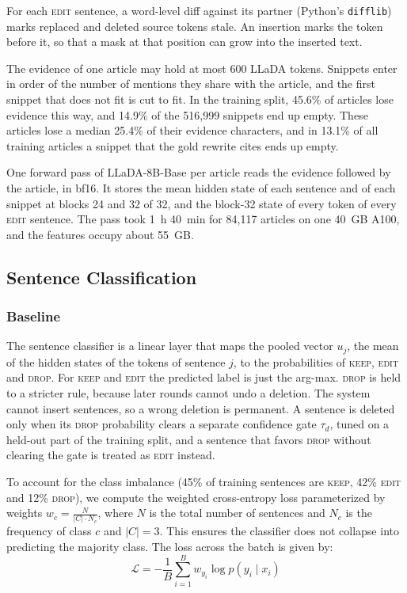 \documentclass[11pt]{article}
\newcommand{\keep}{\textsc{keep}}
\newcommand{\edit}{\textsc{edit}}
\newcommand{\drop}{\textsc{drop}}
\begin{document}
    For each \edit{} sentence, a word-level diff against its partner (Python's \texttt{difflib}) marks replaced and deleted source tokens stale. An insertion marks the token before it, so that a mask at that position can grow into the inserted text.

    The evidence of one article may hold at most 600 LLaDA tokens. Snippets enter in order of the number of mentions they share with the article, and the first snippet that does not fit is cut to fit. In the training split, 45.6\% of articles lose evidence this way, and 14.9\% of the 516,999 snippets end up empty. These articles lose a median 25.4\% of their evidence characters, and in 13.1\% of all training articles a snippet that the gold rewrite cites ends up empty.

    One forward pass of LLaDA-8B-Base \citep{nie-etal-2025-llada} per article reads the evidence followed by the article, in bf16. It stores the mean hidden state of each sentence and of each snippet at blocks 24 and 32 of 32, and the block-32 state of every token of every \edit{} sentence. The pass took 1~h 40~min for 84,117 articles on one 40~GB A100, and the features occupy about 55~GB.
    \subsection{Sentence Classification}
        \subsubsection{Baseline}
        The sentence classifier is a linear layer that maps the pooled vector $u_j$, the mean of the hidden states of the tokens of sentence $j$, to the probabilities of \keep{}, \edit{} and \drop{}. For \keep{} and \edit{} the predicted label is just the arg-max.
        \drop{} is held to a stricter rule, because later rounds cannot undo a deletion. The system cannot insert sentences, so a wrong deletion is permanent. A sentence is deleted only when its \drop{} probability clears a separate confidence gate $\tau_d$, tuned on a held-out part of the training split, and a sentence that favors \drop{} without clearing the gate is treated as \edit{} instead.
    
        To account for the class imbalance (45\% of training sentences are \keep{}, 42\% \edit{} and 12\% \drop{}), we compute the weighted cross-entropy loss parameterized by weights $w_c = \frac{N}{|C| \cdot N_c}$, where $N$ is the total number of sentences and $N_c$ is the frequency of class $c$ and $|C| = 3$. This ensures the classifier does not collapse into predicting the majority class. The loss across the batch is given by:
            \begin{equation}
            \mathcal{L} = - \frac{1}{B} \sum_{i=1}^{B} w_{y_i} \log p(y_i \mid x_i)
            \end{equation}
\end{document}
